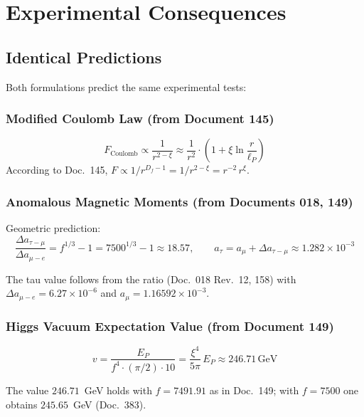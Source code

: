 	\section{Experimental Consequences}
	
	\subsection{Identical Predictions}
	
	Both formulations predict the same experimental tests:
	
	\subsubsection{Modified Coulomb Law (from Document 145)}
	
	\begin{equation}
		F_{\text{Coulomb}} \propto \frac{1}{r^{2-\xi}} \approx \frac{1}{r^{2}} \cdot \left(1 + \xi \ln\frac{r}{\ell_P}\right)
	\end{equation}
	According to Doc.~145, $F \propto 1/r^{D_f-1} = 1/r^{2-\xi} = r^{-2}\,r^{\xi}$.
	
	\subsubsection{Anomalous Magnetic Moments (from Documents 018, 149)}
	
	Geometric prediction:
	\begin{equation}
		\frac{\Delta a_{\tau-\mu}}{\Delta a_{\mu-e}} = f^{1/3} - 1 = 7500^{1/3} - 1 \approx 18.57, \qquad a_\tau = a_\mu + \Delta a_{\tau-\mu} \approx 1.282 \times 10^{-3}
	\end{equation}

	The tau value follows from the ratio (Doc.~018 Rev.~12, 158) with $\Delta a_{\mu-e} = 6.27\times10^{-6}$ and $a_\mu = 1.16592\times10^{-3}$.
	
	\subsubsection{Higgs Vacuum Expectation Value (from Document 149)}
	
	\begin{equation}
		v = \frac{E_P}{f^4 \cdot (\pi/2) \cdot 10} = \frac{\xi^4}{5\pi}\,E_P \approx 246.71\,\text{GeV}
	\end{equation}

	The value $246.71$~GeV holds with $f = 7491.91$ as in Doc.~149; with $f = 7500$ one obtains $245.65$~GeV (Doc.~383).

